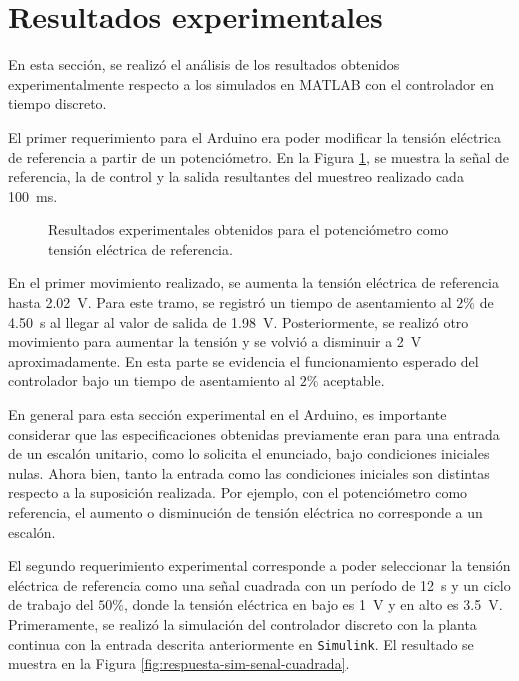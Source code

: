 
\section{Resultados experimentales}

En esta sección, se realizó el análisis de los resultados obtenidos experimentalmente respecto a los simulados en MATLAB con el controlador en tiempo discreto.

El primer requerimiento para el Arduino era poder modificar la tensión eléctrica de referencia a partir de un potenciómetro.
En la Figura \ref{fig:respuesta-exp-pot}, se muestra la señal de referencia, la de control y la salida resultantes del muestreo realizado cada \SI{100}{\milli\second}.

\begin{figure}[htbp]
    \centering
    \caption{Resultados experimentales obtenidos para el potenciómetro como tensión eléctrica de referencia.}
    \label{fig:respuesta-exp-pot}
\end{figure}

En el primer movimiento realizado, se aumenta la tensión eléctrica de referencia hasta \SI{2.02}{\volt}.
Para este tramo, se registró un tiempo de asentamiento al $2\%$ de \SI{4.50}{\second} al llegar al valor de salida de \SI{1.98}{\volt}.
Posteriormente, se realizó otro movimiento para aumentar la tensión y se volvió a disminuir a \SI{2}{\volt} aproximadamente.
En esta parte se evidencia el funcionamiento esperado del controlador bajo un tiempo de asentamiento al $2\%$ aceptable.

En general para esta sección experimental en el Arduino, es importante considerar que las especificaciones obtenidas previamente eran para una entrada de un escalón unitario, como lo solicita el enunciado, bajo condiciones iniciales nulas.
\indent Ahora bien, tanto la entrada como las condiciones iniciales son distintas respecto a la suposición realizada.
Por ejemplo, con el potenciómetro como referencia, el aumento o disminución de tensión eléctrica no corresponde a un escalón.

El segundo requerimiento experimental corresponde a poder seleccionar la tensión eléctrica de referencia como una señal cuadrada con un período de \SI{12}{\second} y un ciclo de trabajo del $50\%$, donde la tensión eléctrica en bajo es \SI{1}{\volt} y en alto es \SI{3.5}{\volt}.
Primeramente, se realizó la simulación del controlador discreto con la planta continua con la entrada descrita anteriormente en \texttt{Simulink}.
El resultado se muestra en la Figura \ref{fig:respuesta-sim-senal-cuadrada}.

